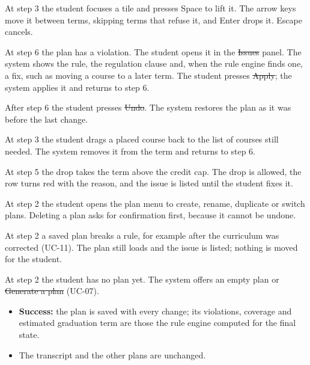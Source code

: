 \begin{altflows}
  \item[A1. Keyboard.] At step 3 the student focuses a tile and presses Space to lift it. The arrow keys move it between
        terms, skipping terms that refuse it, and Enter drops it. Escape cancels.
  \item[A2. Fix suggestion.] At step 6 the plan has a violation. The student opens it in the \st{Issues} panel. The
        system shows the rule, the regulation clause and, when the rule engine finds one, a fix, such as moving a
        course to a later term. The student presses \st{Apply}; the system applies it and returns to step 6.
  \item[A3. Undo.] After step 6 the student presses \st{Undo}. The system restores the plan as it was before the last
        change.
  \item[A4. Remove a course.] At step 3 the student drags a placed course back to the list of courses still needed. The
        system removes it from the term and returns to step 6.
  \item[A5. Over the cap.] At step 5 the drop takes the term above the credit cap. The drop is allowed, the row turns red
        with the reason, and the issue is listed until the student fixes it.
  \item[A6. Several plans.] At step 2 the student opens the plan menu to create, rename, duplicate or switch plans. Deleting
        a plan asks for confirmation first, because it cannot be undone.
  \item[A7. Plan that already breaks a rule.] At step 2 a saved plan breaks a rule, for example after the curriculum was
        corrected (UC-11). The plan still loads and the issue is listed; nothing is moved for the student.
  \item[A8. Start from a goal.] At step 2 the student has no plan yet. The system offers an empty plan or
        \st{Generate a plan} (UC-07).
\end{altflows}

\begin{itemize}
  \item \textbf{Success:} the plan is saved with every change; its violations, coverage and estimated graduation term are
        those the rule engine computed for the final state.
  \item The transcript and the other plans are unchanged.
\end{itemize}

